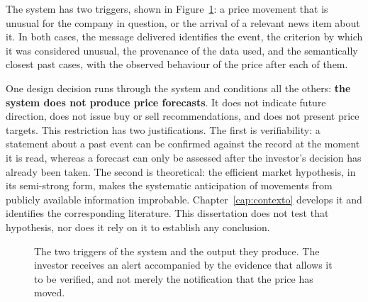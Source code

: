 The system has two triggers, shown in Figure~\ref{fig:conceito}: a price movement that is unusual
for the company in question, or the arrival of a relevant news item about it. In both cases, the
message delivered identifies the event, the criterion by which it was considered unusual, the
provenance of the data used, and the semantically closest past cases, with the observed behaviour
of the price after each of them.

One design decision runs through the system and conditions all the others: \textbf{the system does
not produce price forecasts}. It does not indicate future direction, does not issue buy or sell
recommendations, and does not present price targets. This restriction has two justifications. The
first is verifiability: a statement about a past event can be confirmed against the record at the
moment it is read, whereas a forecast can only be assessed after the investor's decision has
already been taken. The second is theoretical: the efficient market hypothesis, in its semi-strong
form, makes the systematic anticipation of movements from publicly available information
improbable. Chapter~\ref{cap:contexto} develops it and identifies the corresponding literature.
This dissertation does not test that hypothesis, nor does it rely on it to establish any
conclusion.

\begin{figure}[htbp]
\centering
{}
\caption[The two triggers of the system]{The two triggers of the system and the output they
produce. The investor receives an alert accompanied by the evidence that allows it to be verified,
and not merely the notification that the price has moved.}
\label{fig:conceito}
\end{figure}

